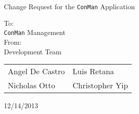 \begin{titlepage}
\Huge
\vspace{2cm}
\begin{center}
Change Request for the \texttt{ConMan} Application\\
\end{center}
\vspace{2cm}
\Large
To:\\
\texttt{ConMan} Management\\

From:\\ 
Development Team

\begin{tabular}{l l}
Angel De Castro & Luis Retana\\
Nicholas Otto   & Christopher Yip
\end{tabular}
\vspace{1cm}

\begin{center}
12/14/2013
\end{center}


\end{titlepage}
